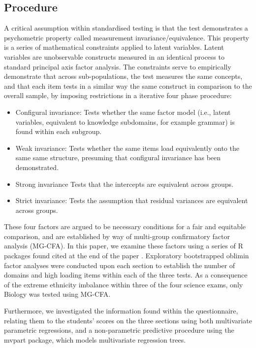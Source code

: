 \documentclass{article}\usepackage[]{graphicx}\usepackage[]{color}
\begin{document}
\subsection{Procedure}
A critical assumption within standardised testing is that the test demonstrates a psychometric property called measurement invariance/equivalence. This property is a series of mathematical constraints applied to latent variables. Latent variables are unobservable constructs measured in an identical process to standard principal axis factor analysis. The constraints serve to empirically demonstrate that across sub-populations, the test measures the same concepts, and that each item tests in a similar way the same construct in comparison to the overall sample, by imposing restrictions in a iterative four phase procedure: \begin{itemize}
\item{Configural invariance:} 
Tests whether the same factor model (i.e., latent variables, equivalent to knowledge subdomains, for example grammar) is found within each subgroup.
\item{Weak invariance:}
Tests whether the same items load equivalently onto the same same structure, presuming that configural invariance has been demonstrated.
\item{Strong invariance}
Tests that the intercepts are equivalent across groups.
\item{Strict invariance:}
Tests the assumption that residual variances are equivalent across groups.
\end{itemize}
These four factors are argued to be necessary conditions for a fair and equitable comparison\cite{Meredith}, and are established by way of multi-group confirmatory factor analysis (MG-CFA). In this paper, we examine these factors using a series of R packages found cited at the end of the paper \cite{psych,lavaan,semTools}. Exploratory bootstrapped oblimin factor analyses were conducted upon each section to establish the number of domains and high loading items within each of the three tests. As a consequence of the extreme ethnicity imbalance within three of the four science exams, only Biology was tested using MG-CFA.

Furthermore, we investigated the information found within the questionnaire, relating them to the students' scores on the three sections using both multivariate parametric regressions, and a non-parametric predictive procedure using the mvpart package, which models multivariate regression trees.
\end{document}
